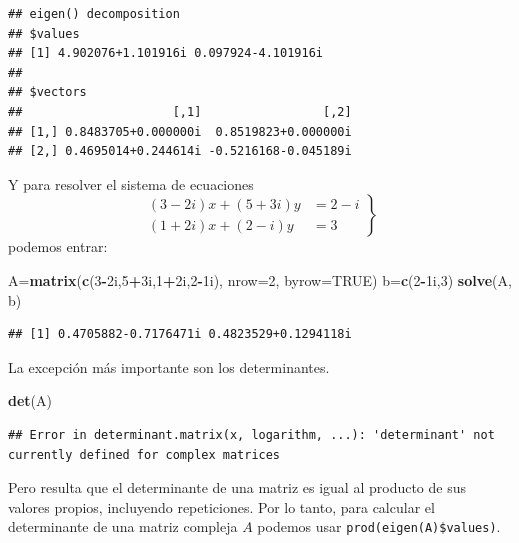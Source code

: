 \documentclass[]{book}
\newenvironment{Shaded}{\begin{snugshade}}{\end{snugshade}}
\newcommand{\DataTypeTok}[1]{\textcolor[rgb]{0.13,0.29,0.53}{#1}}
\newcommand{\DecValTok}[1]{\textcolor[rgb]{0.00,0.00,0.81}{#1}}
\newcommand{\KeywordTok}[1]{\textcolor[rgb]{0.13,0.29,0.53}{\textbf{#1}}}
\newcommand{\NormalTok}[1]{#1}
\newcommand{\OperatorTok}[1]{\textcolor[rgb]{0.81,0.36,0.00}{\textbf{#1}}}
\newcommand{\OtherTok}[1]{\textcolor[rgb]{0.56,0.35,0.01}{#1}}
\theoremstyle{definition}
\theoremstyle{definition}
\theoremstyle{definition}
\theoremstyle{remark}
\begin{document}
\begin{verbatim}
## eigen() decomposition
## $values
## [1] 4.902076+1.101916i 0.097924-4.101916i
## 
## $vectors
##                     [,1]                 [,2]
## [1,] 0.8483705+0.000000i  0.8519823+0.000000i
## [2,] 0.4695014+0.244614i -0.5216168-0.045189i
\end{verbatim}

Y para resolver el sistema de ecuaciones
\[
\left.
\begin{array}{rl} 
(3-2i)x+(5+3i)y & = 2-i\\
(1+2i)x+(2-i)y & = 3 
\end{array}
\right\}
\]
podemos entrar:

\begin{Shaded}
\begin{Highlighting}[]
\NormalTok{A=}\KeywordTok{matrix}\NormalTok{(}\KeywordTok{c}\NormalTok{(}\DecValTok{3}\OperatorTok{-}\NormalTok{2i,}\DecValTok{5}\OperatorTok{+}\NormalTok{3i,}\DecValTok{1}\OperatorTok{+}\NormalTok{2i,}\DecValTok{2}\OperatorTok{-}\NormalTok{1i), }\DataTypeTok{nrow=}\DecValTok{2}\NormalTok{, }\DataTypeTok{byrow=}\OtherTok{TRUE}\NormalTok{)}
\NormalTok{b=}\KeywordTok{c}\NormalTok{(}\DecValTok{2}\OperatorTok{-}\NormalTok{1i,}\DecValTok{3}\NormalTok{)}
\KeywordTok{solve}\NormalTok{(A, b)}
\end{Highlighting}
\end{Shaded}

\begin{verbatim}
## [1] 0.4705882-0.7176471i 0.4823529+0.1294118i
\end{verbatim}

La excepción más importante son los determinantes.

\begin{Shaded}
\begin{Highlighting}[]
\KeywordTok{det}\NormalTok{(A)}
\end{Highlighting}
\end{Shaded}

\begin{verbatim}
## Error in determinant.matrix(x, logarithm, ...): 'determinant' not currently defined for complex matrices
\end{verbatim}

Pero resulta que el determinante de una matriz es igual al producto de sus valores propios, incluyendo repeticiones. Por lo tanto, para calcular el determinante de una matriz compleja \(A\) podemos usar \texttt{prod(eigen(A)\$values)}.
\end{document}

